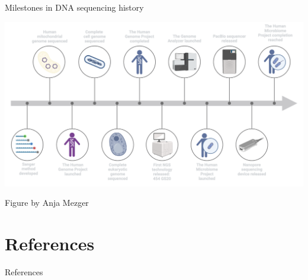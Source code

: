 \documentclass[10pt]{beamer}
\newcommand{\creditdark}[1]{{\vspace{\fill} \par \raggedleft \scriptsize \mdseries \color{scMGray} #1 \par}}
\begin{document}
\begin{frame}[standout]{Milestones in DNA sequencing history}
	\vspace*{-1.1cm}
	\begin{center}
		\hspace*{-1.1cm}
		\includegraphics[width=1.2\textwidth]{./figures/timeline.png}
	\end{center}
	\creditdark{Figure by Anja Mezger}
\end{frame}


\section{References}


\begin{frame}[allowframebreaks]{References}
\begingroup
\renewcommand*{\bibfont}{\footnotesize} 
\printbibliography[heading=none]
\endgroup
\end{frame}
\end{document}
